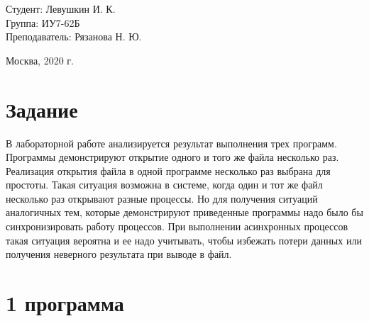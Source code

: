 \documentclass[a4paper,12pt]{article}
\begin{document}
	\large
	\begin{flushright}
		Студент: Левушкин И. К. \\
		Группа: ИУ7-62Б \\
		Преподаватель: Рязанова Н. Ю. \\
	\end{flushright}
	
	\vspace*{30mm}
	\begin{center}
		Москва, 2020 г.  
	\end{center}
	\thispagestyle{empty}
	
	
	\newpage
	
	\section*{Задание}
	
	В лабораторной работе анализируется результат выполнения трех программ. Программы демонстрируют открытие одного и того же файла
	несколько раз. Реализация открытия файла в одной программе несколько раз выбрана для простоты. Такая ситуация возможна в системе, когда
	один и тот же файл несколько раз открывают разные процессы. Но для получения ситуаций аналогичных тем, которые демонстрируют приведенные
	программы надо было бы синхронизировать работу процессов. При выполнении асинхронных процессов такая ситуация вероятна и ее надо учитывать, чтобы избежать потери данных или получения неверного результата
	при выводе в файл.
	
	\newpage
	
	\section*{1 программа}
	
\end{document}
